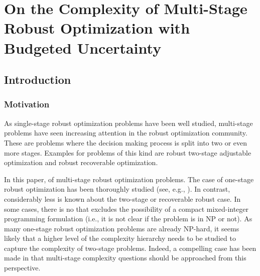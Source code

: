 







\chapter{On the Complexity of Multi-Stage Robust Optimization with Budgeted Uncertainty}
\label{ch:multistage-complexity}

\section{Introduction}

\subsection{Motivation}

As single-stage robust optimization problems have been well studied, multi-stage problems have seen increasing attention in the robust optimization community. These are problems where the decision making process is split into two or even more stages. Examples for problems of this kind are robust two-stage adjustable optimization and robust recoverable optimization.

In this paper,  of multi-stage robust optimization problems. The case of one-stage robust optimization has been thoroughly studied (see, e.g., \cite{kasperski2016robust}). In contrast, considerably less is known about the two-stage or recoverable robust case. In some cases, there is no
that excludes the possibility of a compact mixed-integer programming formulation (i.e., it is not clear if the problem is in NP or not). As many one-stage robust optimization problems are already NP-hard, it seems likely that a higher level of the complexity hierarchy \cite{stockmeyer1976polynomial} needs to be studied to capture the complexity of two-stage problems. Indeed, a compelling case has been made in \cite{woeginger2021trouble} that multi-stage complexity questions should be approached from this perspective.

